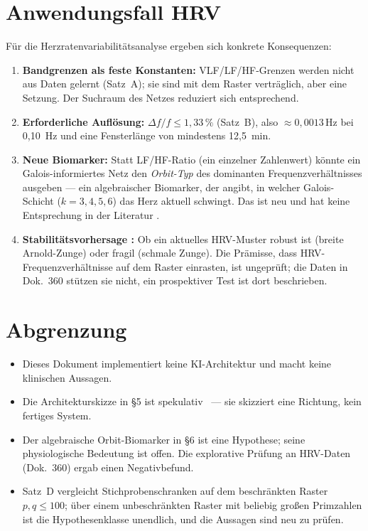 \section{Anwendungsfall HRV}

Für die Herzratenvariabilitätsanalyse ergeben sich konkrete Konsequenzen:

\begin{enumerate}
\item \textbf{Bandgrenzen als feste Konstanten:} VLF/LF/HF-Grenzen
  werden nicht aus Daten gelernt (Satz~A); sie sind mit dem Raster
  verträglich, aber eine Setzung. Der Suchraum des Netzes reduziert sich
  entsprechend.
\item \textbf{Erforderliche Auflösung:} $\Delta f/f \le 1{,}33\,\%$
  (Satz~B), also $\approx0{,}0013$\,Hz bei 0{,}10~Hz und eine
  Fensterlänge von mindestens 12{,}5~min.
\item \textbf{Neue Biomarker:} Statt LF/HF-Ratio (ein einzelner Zahlenwert)
  könnte ein Galois-informiertes Netz den \emph{Orbit-Typ} des dominanten
  Frequenzverhältnisses ausgeben --- ein algebraischer Biomarker, der
  angibt, in welcher Galois-Schicht ($k=3,4,5,6$) das Herz aktuell
  schwingt. Das ist neu und hat keine Entsprechung in der Literatur \SM.
\item \textbf{Stabilitätsvorhersage \SM:} Ob ein aktuelles HRV-Muster
  robust ist (breite Arnold-Zunge) oder fragil (schmale Zunge). Die
  Prämisse, dass HRV-Frequenzverhältnisse auf dem Raster einrasten, ist
  ungeprüft; die Daten in Dok.~360 stützen sie nicht, ein prospektiver
  Test ist dort beschrieben.
\end{enumerate}

\section{Abgrenzung}

\begin{itemize}
\item Dieses Dokument implementiert keine KI-Architektur und macht keine
  klinischen Aussagen.
\item Die Architekturskizze in §5 ist spekulativ \SM\ --- sie skizziert
  eine Richtung, kein fertiges System.
\item Der algebraische Orbit-Biomarker in §6 ist eine Hypothese; seine
  physiologische Bedeutung ist offen. Die explorative Prüfung an HRV-Daten
  (Dok.~360) ergab einen Negativbefund.
\item Satz~D vergleicht Stichprobenschranken auf dem beschränkten
  Raster $p,q\le100$; über einem unbeschränkten Raster mit beliebig
  großen Primzahlen ist die Hypothesenklasse unendlich, und die Aussagen
  sind neu zu prüfen.
\end{itemize}

